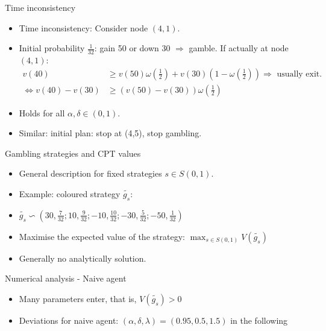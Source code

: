 \begin{frame}{Time inconsistency}
    \begin{itemize}
        \item Time inconsistency: Consider node $(4,1)$.\medskip
        \item Initial probability $\frac{1}{32}$: gain 50 or down 30  $\Rightarrow$ gamble. If actually at node $(4,1)$:
        \begin{align*}v(40) &\geq v(50)\omega \left(\frac{1}{2}\right)+v(30)\left(1-\omega \left(\frac{1}{2}\right)\right) \Rightarrow \text{ usually exit.}\\
        \Leftrightarrow v(40)-v(30) &\geq (v(50)-v(30))\omega \left(\frac{1}{2}\right)\end{align*}
        \item Holds for all $\alpha, \delta \in (0,1)$.\medskip
        \item Similar: initial plan: stop at (4,5), stop gambling.\medskip
    \end{itemize}
\end{frame}


\begin{frame}{Gambling strategies and CPT values}
    \begin{itemize}
        \item General description for fixed strategies $s \in S(0,1)$.\bigskip
        \item Example: coloured strategy $\tilde{g_s}$:\bigskip
        \item $\tilde{g_s} \backsim \left(30,\frac{7}{32}; 10,\frac{9}{32}; -10, \frac{10}{32}; -30,\frac{5}{32};-50,\frac{1}{32} \right)  $\bigskip
        \item Maximise the expected value of the strategy: $\max_{s \in S(0,1)} V(\tilde{g_s})$\bigskip
        \item Generally no analytically solution.\bigskip
    \end{itemize}
\end{frame}

\begin{frame}{Numerical analysis - Naive agent}
    \begin{itemize}
        \item Many parameters enter, that is, $V(\tilde{g_s})>0 $\medskip
        \item Deviations for naive agent: $(\alpha,\delta,\lambda)=(0.95,0.5,1.5)$ in the following\medskip
    \end{itemize}
\end{frame}

